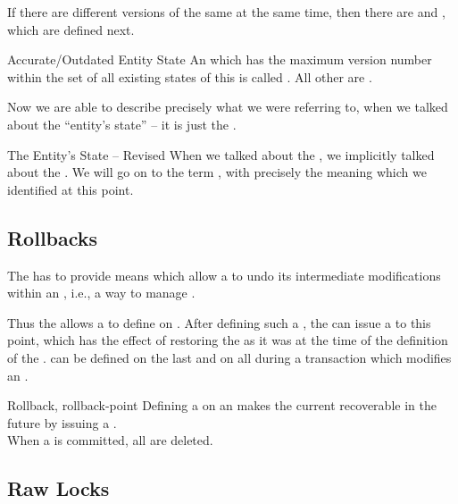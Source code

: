 \documentclass[a4paper, 12pt]{book}
\begin{document}
%
If there are different versions of the same  at the same time, then
there are  and , which are defined
next. 
%
\begin{definition*}{Accurate/Outdated Entity State}
  An  which has the maximum version number within the set
  of all existing states of this  is called . All other  are .
\end{definition*}
%
Now we are able to describe precisely what we were referring to, when we
talked about the ``entity's state'' -- it is just the . 
%
\begin{remark*}{The Entity's State -- Revised}
  When we talked about the , we implicitly talked about the
  . We will go on to the term , with precisely the meaning which we identified at this point.  
\end{remark*}



\subsection{Rollbacks}
\label{sec:def:rollback}

The \SYNEIGHT has to provide means which allow a  to undo its
intermediate modifications within an , i.e., a way to manage
.

Thus the \SYNEIGHT allows a  to define 
on . After defining such a , the 
can issue a  to this point, which has the effect of restoring the
 as it was at the time of the definition of the
. 
%
 can be defined on the last  and
on all  during a transaction which modifies an
. 
%
\begin{definition*}{Rollback, rollback-point}
  Defining a  on an  makes the current
   recoverable in the future by issuing a
  .\\
  When a  is committed, all 
  are deleted. 
\end{definition*}


\subsection{Raw Locks}
\label{sec:esa:def:raw-locks}
\end{document}
